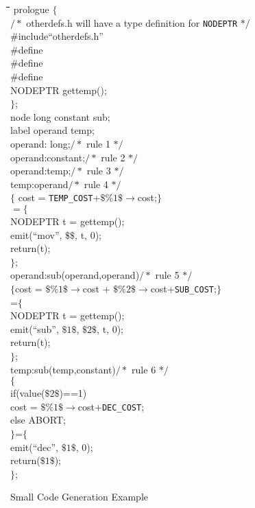 \begin{figure}
\begin{tabbing}
\hspace{1in}\=\hspace{1in}\=\hspace{1in}\=\hspace{1in}\=
\hspace{1in}\=\hspace{1in}\=\hspace{1in}\=\hspace{1in}\=\kill
prologue \> $\{$\\
$/*$ otherdefs.h will have a type definition for {\tt NODEPTR} $*/$\\
\#include\>``otherdefs.h''\\
\#define\>\\
\#define\>\\
\#define\>\\
NODEPTR \> gettemp();\\
$\}$;\\[4pt]
node \> long constant sub;\\
label \> operand temp;\\[4pt]
operand: \> long;\>\>\>$/*$ rule 1 $*/$\\
operand:\>constant;\>\>\>$/*$ rule 2 $*/$\\
operand:\>temp;\>\>\>$/*$ rule 3 $*/$\\[4pt]
temp:\>operand\>\>\>$/*$ rule 4 $*/$\\
\>$\{$ cost = {\tt TEMP\_COST}+$\$\%1\$\to$cost;$\}$\\
\>$=\{$\\
\>\>NODEPTR t = gettemp();\\
\>\> emit(``mov'', $\$\$$, t, 0);\\
\>\>return(t);\\
\>$\}$;\\[4pt]
operand:\>sub(operand,operand)\>\>\>$/*$ rule 5 $*/$\\
\>$\{$cost = $\$\%1\$\to$cost + $\$\%2\$\to$cost+{\tt SUB\_COST};$\}$\\
\>=$\{$\\
\>\>NODEPTR t = gettemp();\\
\>\>emit(``sub'', $\$1\$$, $\$2\$$, t, 0);\\
\>\>return(t);\\
\>$\}$;\\[4pt]
temp:\>sub(temp,constant)\>\>\>$/*$ rule 6 $*/$\\
\>$\{$\\
\>\>if(value($\$2\$$)==1)\\
\>\>\>cost = $\$\%1\$\to$cost+{\tt DEC\_COST};\\
\>\>else ABORT;\\
\>$\}$=$\{$\\
\>\>emit(``dec'', $\$1\$$, 0);\\
\>\>return($\$1\$$);\\
\>$\}$;
\end{tabbing}
\caption{Small Code Generation Example}
\label{example}
\end{figure}

